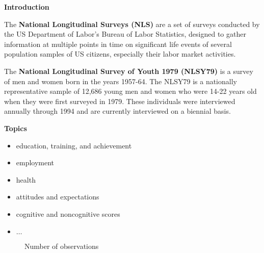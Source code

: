 \begin{frame}\begin{center}
    \LARGE\textbf{Introduction}
\end{center}\end{frame}
\begin{frame}
The \textbf{National Longitudinal Surveys (NLS)} are a set of surveys conducted by the US Department of Labor's Bureau of Labor Statistics, designed to gather information at multiple points in time on significant life events of several population samples of US citizens, especially their labor market activities.
\end{frame}
\begin{frame}
The \textbf{National Longitudinal Survey of Youth 1979 (NLSY79)} is a survey of men and women born in the years 1957-64. The NLSY79 is a nationally representative sample of 12,686 young men and women who were 14-22 years old when they were first surveyed in 1979. These individuals were interviewed annually through 1994 and are currently interviewed on a biennial basis.
\end{frame}
\begin{frame}\textbf{Topics}\vspace{0.3cm}
\begin{itemize}\setlength\itemsep{1em}
\item education, training, and achievement
\item employment
\item health
\item attitudes and expectations
\item cognitive and noncognitive scores
\item $\hdots$
\end{itemize}
\end{frame}
\begin{frame}\begin{figure}[htp]\centering
\caption{Number of observations}
\end{figure}\end{frame}
